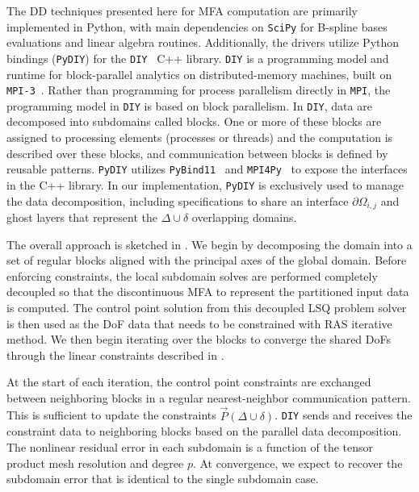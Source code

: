 The DD techniques presented here for MFA computation are primarily implemented in Python, with main dependencies on \texttt{SciPy} for B-spline bases evaluations and linear algebra routines. Additionally, the drivers utilize Python bindings (\texttt{PyDIY}) for the \texttt{DIY}~\cite{morozov16} C++ library. \texttt{DIY} is a programming model and runtime
for block-parallel analytics on distributed-memory machines, built on \texttt{MPI-3}~\cite{dongarra13}.  Rather than programming
for process parallelism directly in \texttt{MPI}, the programming model in \texttt{DIY} is based on block parallelism. In \texttt{DIY}, data are decomposed
into subdomains called blocks. One or more of these blocks are assigned to processing elements (processes or threads) and the computation is
described over these blocks, and communication between blocks is defined by reusable patterns. 
\texttt{PyDIY} utilizes \texttt{PyBind11}~\cite{jakob17} and \texttt{MPI4Py}~\cite{dalcin11} to expose the interfaces in the C++ library. In our implementation, \texttt{PyDIY} is exclusively used to manage the data decomposition, including specifications to share an interface $\partial \Omega_{i,j}$ and ghost layers that represent the $\Delta \cup  \delta$ overlapping domains.

The overall approach is sketched in .
We begin by decomposing the domain into a set of regular blocks aligned with the principal axes
of the global domain. Before enforcing constraints, the local subdomain solves are performed completely decoupled so that the discontinuous MFA to represent the partitioned input data is computed. %
%
The control point solution from this decoupled LSQ problem solver is then used as the DoF data that needs to be constrained with RAS iterative method.
We then begin iterating over the blocks to converge the shared DoFs through the linear constraints described in . 

At the start of each iteration, the control point constraints are exchanged between neighboring blocks in a regular nearest-neighbor communication pattern. This is sufficient to update the constraints $\vec{P}(\Delta \cup \delta)$. \texttt{DIY} 
sends and receives the constraint data to neighboring blocks based on the parallel data decomposition.
The nonlinear residual error in each subdomain is a function of the tensor product mesh resolution and degree $p$. At convergence, we expect to recover the subdomain error that is identical to the single subdomain case.

